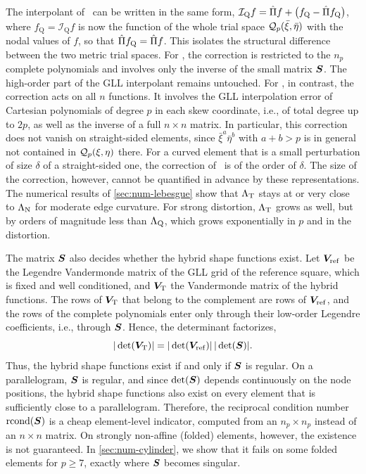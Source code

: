 The interpolant of \PM\ can be written in the same form, $\mathcal I_{\mathrm{Q}}f=\hat\Pi f+\bigl(f_{\mathrm{Q}}-\hat\Pi f_{\mathrm{Q}}\bigr)$, where $f_{\mathrm{Q}}=\mathcal I_{\mathrm{Q}}f$ is now the function of the whole trial space $\mathcal Q_p(\bar\xi,\bar\eta)$ with the nodal values of $f$, so that $\hat\Pi f_{\mathrm{Q}}=\hat\Pi f$. This isolates the structural difference between the two metric trial spaces. For \PH, the correction is restricted to the $n_p$ complete polynomials and involves only the inverse of the small matrix $\bm{S}$. The high-order part of the GLL interpolant remains untouched. For \PM, in contrast, the correction acts on all $n$ functions. It involves the GLL interpolation error of Cartesian polynomials of degree $p$ in each skew coordinate, i.e., of total degree up to $2p$, as well as the inverse of a full $n\times n$ matrix. In particular, this correction does not vanish on straight-sided elements, since $\bar\xi^a\bar\eta^b$ with $a+b>p$ is in general not contained in $\mathcal Q_p(\xi,\eta)$ there. For a curved element that is a small perturbation of size $\delta$ of a straight-sided one, the correction of \PH\ is of the order of $\delta$. The size of the correction, however, cannot be quantified in advance by these representations. The numerical results of \cref{sec:num-lebesgue} show that $\Lambda_{\mathrm{T}}$ stays at or very close to $\Lambda_{\mathrm{N}}$ for moderate edge curvature. For strong distortion, $\Lambda_{\mathrm{T}}$ grows as well, but by orders of magnitude less than $\Lambda_{\mathrm{Q}}$, which grows exponentially in $p$ and in the distortion.

The matrix $\bm{S}$ also decides whether the hybrid shape functions exist. Let $\bm{V}_{\mathrm{ref}}$ be the Legendre Vandermonde matrix of the GLL grid of the reference square, which is fixed and well conditioned, and $\bm{V}_{\mathrm{T}}$ the Vandermonde matrix of the hybrid functions. The rows of $\bm{V}_{\mathrm{T}}$ that belong to the complement are rows of $\bm{V}_{\mathrm{ref}}$, and the rows of the complete polynomials enter only through their low-order Legendre coefficients, i.e., through $\bm{S}$. Hence, the determinant factorizes,
%
\begin{equation}
  |\det(\bm{V}_{\mathrm{T}})|=|\det(\bm{V}_{\mathrm{ref}})|\,|\det(\bm{S})| .
  \label{eq:factor}
\end{equation}
%
Thus, the hybrid shape functions exist if and only if $\bm{S}$ is regular. On a parallelogram, $\bm{S}$ is regular, and since $\det(\bm{S})$ depends continuously on the node positions, the hybrid shape functions also exist on every element that is sufficiently close to a parallelogram. Therefore, the reciprocal condition number $\mathrm{rcond}(\bm{S})$ is a cheap element-level indicator, computed from an $n_p\times n_p$ instead of an $n\times n$ matrix. On strongly non-affine (folded) elements, however, the existence is not guaranteed. In \cref{sec:num-cylinder}, we show that it fails on some folded elements for $p\ge7$, exactly where $\bm{S}$ becomes singular.
%
